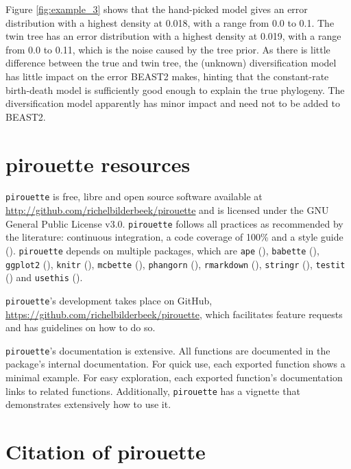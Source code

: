 \documentclass{article}
\begin{document}
Figure \ref{fig:example_3} shows that the hand-picked model 
gives an error distribution with a highest density at 0.018,
with a range from 0.0 to 0.1.
The twin tree has an error distribution with a highest density at 0.019,
with a range from 0.0 to 0.11, which is the noise caused by the tree prior.
As there is little difference between the true and twin tree,
the (unknown) diversification model has little impact on the error
BEAST2 makes, hinting that the constant-rate birth-death model is
sufficiently good enough to explain the true phylogeny. 
The diversification model apparently has minor impact and need not to be
added to BEAST2.

\section{pirouette resources}

\verb;pirouette; is free, libre and open source software available at 
\url{http://github.com/richelbilderbeek/pirouette}
and is licensed under the GNU General Public License v3.0.
\verb;pirouette; follows all practices as recommended by the
literature: continuous integration, a code coverage of 100\%
and a style guide (\cite{style_guide}).
\verb;pirouette; depends on multiple packages, which are 
\verb;ape; (\cite{APE}), 
\verb;babette; (\cite{bilderbeek2018babette}),
\verb;ggplot2; (\cite{ggplot2}),
\verb;knitr; (\cite{knitr}),
\verb;mcbette; (\cite{mcbette}),
\verb;phangorn; (\cite{phangorn}),
\verb;rmarkdown; (\cite{rmarkdown}),
\verb;stringr; (\cite{stringr}),
\verb;testit; (\cite{testit}) and 
\verb;usethis; (\cite{usethis}).

\verb;pirouette;'s development takes place on GitHub,
\url{https://github.com/richelbilderbeek/pirouette}, 
which facilitates feature requests and 
has guidelines on how to do so.

\verb;pirouette;'s documentation is extensive. All functions are documented
in the package's internal documentation. For quick use, 
each exported function shows a minimal example. 
For easy exploration, each exported function's documentation links to related functions.
Additionally, \verb;pirouette; has a vignette that demonstrates extensively how
to use it. 

\section{Citation of pirouette}
\end{document}
